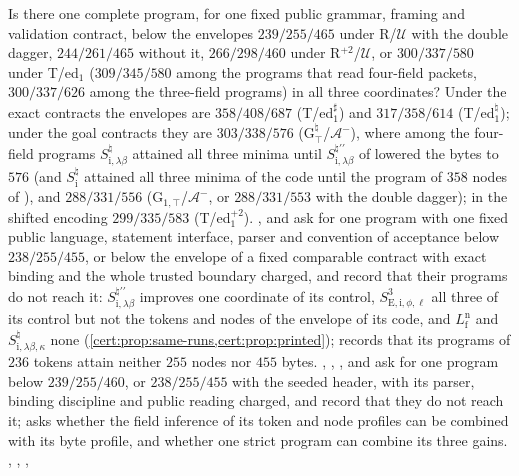 \begin{question}
Is there one complete program, for one fixed public grammar, framing and
validation contract, below the envelopes $239/255/465$ under R/$\mathcal U$ with
the double dagger, $244/261/465$ without it, $266/298/460$ under
R$^{+2}$/$\mathcal U$, or $300/337/580$ under T/ed$_1$ ($309/345/580$ among the
programs that read four-field packets, $300/337/626$ among the three-field programs) in
all three coordinates? Under the exact contracts the envelopes are $358/408/687$
(T/ed$_1^{\sharp}$) and $317/358/614$ (T/ed$_1^{\natural}$); under the goal contracts
they are $303/338/576$ (G$^{\natural}_{\top}$/$\mathcal A^{-}$), where among the four-field
programs $S^{\natural}_{\mathrm{i},\lambda\beta}$ attained all three minima until
$S^{\natural\prime\prime}_{\mathrm{i},\lambda\beta}$ of  lowered the bytes to
$576$ (and $S^{\natural}_{\mathrm i}$ attained all three minima of the code until the program of $358$
nodes of ), and $288/331/556$ (G$_{1,\top}$/$\mathcal A^{-}$, or $288/331/553$
with the double dagger); in the shifted encoding $299/335/583$ (T/ed$_1^{+2}$).
,  and  ask for one program with one
fixed public language, statement interface, parser and convention of acceptance below
$238/255/455$, or below the envelope of a fixed comparable contract with exact binding and the whole
trusted boundary charged, and record that their programs do not reach it:
$S^{\natural\prime\prime}_{\mathrm{i},\lambda\beta}$ improves one coordinate of its control,
$S^{3}_{\mathrm{E,i},\phi,\ell}$ all three of its control but not the tokens and nodes of the envelope
of its code, and $L^{\mathrm n}_{\mathrm f}$ and $S^{\natural}_{\mathrm{i},\lambda\beta,\kappa}$ none
(\cref{cert:prop:same-runs,cert:prop:printed});  records that its programs of
$236$ tokens attain neither $255$ nodes nor $455$ bytes. , ,
,  and  ask
for one program below $239/255/460$, or $238/255/455$ with the seeded header, with its parser,
binding discipline and public reading charged, and record that they do not reach it;
 asks whether the field inference of its token and node profiles can be
combined with its byte profile, and  whether one strict program can
combine its three gains.
, , ,

\end{question}
